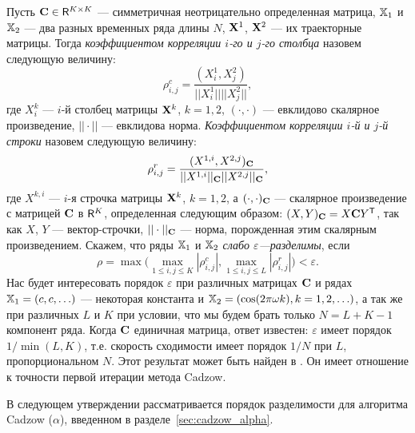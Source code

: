 \documentclass[12pt,a4paper,fleqn,leqno]{article}
\begin{document}
Пусть $\mathbf{C} \in \mathsf{R}^{K \times K}$ --- симметричная неотрицательно определенная матрица, $\mathbb{X}_1$ и $\mathbb{X}_2$ ---  два разных временных ряда длины $N$, $\mathbf{X}^1$, $\mathbf{X}^2$ --- их траекторные матрицы. Тогда \emph{коэффициентом корреляции $i$-го и $j$-го столбца} назовем следующую величину:
\begin{equation}\label{col_corr}
\rho^c_{i,j} = \frac{(X^1_i, X^2_j)}{||X^1_i|| ||X^2_j||},
\end{equation}
где $X^k_i$ --- $i$-й столбец матрицы $\mathbf{X}^k$, $k = 1, 2$, $(\cdot, \cdot)$ --- евклидово скалярное произведение, $||\cdot||$ --- евклидова норма. \emph{Коэффициентом корреляции $i$-й и $j$-й строки} назовем следующую величину:
\begin{equation}\label{row_corr}
\rho^r_{i,j} = \frac{(X^{1,i}, X^{2,j})_{\mathbf{C}}}{||X^{1,i}||_{\mathbf{C}} ||X^{2,j}||_{\mathbf{C}}},
\end{equation}
где $X^{k,i}$ --- $i$-я строчка матрицы $\mathbf{X}^k$, $k = 1, 2$, а $(\cdot, \cdot)_{\mathbf{C}}$ --- скалярное произведение с матрицей $\mathbf{C}$ в $\mathsf{R}^K$, определенная следующим образом: $(X, Y)_{\mathbf{C}} = X \mathbf{C} Y^{\mathsf{T}}$, так как $X$, $Y$ --- вектор-строчки, $|| \cdot ||_{\mathbf{C}}$ --- норма, порожденная этим скалярным произведением. Скажем, что ряды $\mathbb{X}_1$ и $\mathbb{X}_2$ \emph{слабо $\varepsilon$---разделимы}, если
\begin{equation}\label{weak_sep_eq}
\rho = \max\Big(\max_{1 \le i,j \le K}|\rho^c_{i,j}|, \max_{1 \le i,j \le L}|\rho^r_{i,j}|\Big) < \varepsilon.
\end{equation}
Нас будет интересовать порядок $\varepsilon$ при различных матрицах $\mathbf{C}$ и рядах $\mathbb{X}_1 = (c, c, \ldots)$ --- некоторая константа и $\mathbb{X}_2 = (\cos(2 \pi \omega k), k = 1, 2, \ldots)$, а так же при различных $L$ и $K$ при условии, что мы будем брать только $N = L + K - 1$ компонент ряда. Когда $\mathbf{C}$ единичная матрица, ответ известен: $\varepsilon$ имеет порядок $1/\min(L,K)$, т.е. скорость сходимости имеет порядок $1/N$ при $L$, пропорциональном $N$. 
Этот результат может быть найден в \cite[Раздел 6.1]{Golyandina.etal2001}. Он имеет отношение к точности первой итерации метода Cadzow.

В следующем утверждении рассматривается порядок разделимости для алгоритма Cadzow ($\alpha$), введенном в разделе~\ref{sec:cadzow_alpha}.
\end{document}
